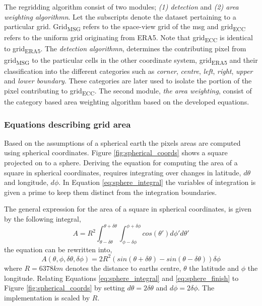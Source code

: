 The regridding algorithm consist of two modules; \textit{(1) detection} and \textit{(2) area weighting algorithmn}. Let the subscripts denote the dataset pertaining to a particular grid. Grid\textsubscript{MSG} refers to the space-view grid of the \acrlong{msg} and grid\textsubscript{ECC} refers to the uniform grid originating from ERA5. Note that grid\textsubscript{ECC} is identical to  grid\textsubscript{ERA5}. The \textit{detection algorithmn}, determines the contributing pixel from grid\textsubscript{MSG} 
to the particular cells in the other coordinate system,
grid\textsubscript{ERA5} 
and their classification into the different categories such as \textit{corner}, \textit{centre}, \textit{left}, \textit{right}, \textit{upper} and \textit{lower boundary}. These categories are later used to isolate the portion of the pixel contributing to grid\textsubscript{ECC}.
The second module, \textit{the area weighting}, consist of the category based area weighting algorithm based on the developed equations.

\subsubsection{Equations describing grid area}
Based on the assumptions  of a spherical earth the pixels areas are computed using spherical coordinates. Figure \ref{fig:spherical_coords} shows a square projected on to a sphere. Deriving the equation for computing the area of a square in spherical coordinates, requires integrating over changes in latitude, $d\theta$ and longitude, $d\phi$. In Equation \eqref{eq:sphere_integral} the variables of integration is given a prime to keep them distinct from the integration boundaries.

The general expression for the area of a square in spherical coordinates, is given by the following integral,
\begin{equation} \label{eq:sphere_integral}
    A = R^2\int_{ \theta - \delta \theta }^{\theta + \delta \theta} \int_{ \phi - \delta \phi }^{\phi + \delta \phi} cos\left( \theta' \right) d\phi' d\theta'
\end{equation}
the equation can be rewritten into,
\begin{equation} \label{eq:sphere_finish}
    A \left( \theta, \phi, \delta \theta, \delta \phi   \right)= 2R^2 \left( sin\left( \theta + \delta \theta  \right) - sin\left(  \theta - \delta \theta  \right) \right) \delta \phi
\end{equation}
where $R=6378km$ denotes the distance to earths centre, $\theta$ the latitude and $\phi$ the longitude. Relating Equations \eqref{eq:sphere_integral} and \eqref{eq:sphere_finish} to Figure \ref{fig:spherical_coords} by setting $d \theta = 2 \delta \theta$ and $d \phi = 2 \delta \phi$. The implementation is scaled by $R$.

